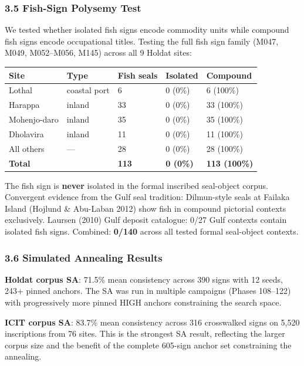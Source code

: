 \documentclass[
  11pt,
]{article}
\newcounter{none} %
\begin{document}
\subsubsection{3.5 Fish-Sign Polysemy
Test}\label{fish-sign-polysemy-test}

We tested whether isolated fish signs encode commodity units while
compound fish signs encode occupational titles. Testing the full fish
sign family (M047, M049, M052--M056, M145) across all 9 Holdat sites:

{\def\LTcaptype{none} %
\begin{longtable}[]{@{}lllll@{}}
\toprule\noalign{}
Site & Type & Fish seals & Isolated & Compound \\
\midrule\noalign{}
\endhead
\bottomrule\noalign{}
\endlastfoot
Lothal & coastal port & 6 & 0 (0\%) & 6 (100\%) \\
Harappa & inland & 33 & 0 (0\%) & 33 (100\%) \\
Mohenjo-daro & inland & 35 & 0 (0\%) & 35 (100\%) \\
Dholavira & inland & 11 & 0 (0\%) & 11 (100\%) \\
All others & --- & 28 & 0 (0\%) & 28 (100\%) \\
\textbf{Total} & & \textbf{113} & \textbf{0 (0\%)} & \textbf{113
(100\%)} \\
\end{longtable}
}

The fish sign is \textbf{never} isolated in the formal inscribed
seal-object corpus. Convergent evidence from the Gulf seal tradition: Dilmun-style
seals at Failaka Island (Hojlund \& Abu-Laban 2012) show fish in
compound pictorial contexts exclusively. Laursen (2010) Gulf deposit
catalogue: 0/27 Gulf contexts contain isolated fish signs. Combined:
\textbf{0/140} across all tested formal seal-object contexts.

\subsubsection{3.6 Simulated Annealing
Results}\label{simulated-annealing-results}

\textbf{Holdat corpus SA}: 71.5\% mean consistency across 390 signs with
12 seeds, 243+ pinned anchors. The SA was run in multiple campaigns
(Phases 108--122) with progressively more pinned HIGH anchors
constraining the search space.

\textbf{ICIT corpus SA}: 83.7\% mean consistency across 316
crosswalked signs on 5,520 inscriptions from 76 sites. This is the
strongest SA result, reflecting the larger corpus size and the benefit
of the complete 605-sign anchor set constraining the annealing.
\end{document}
